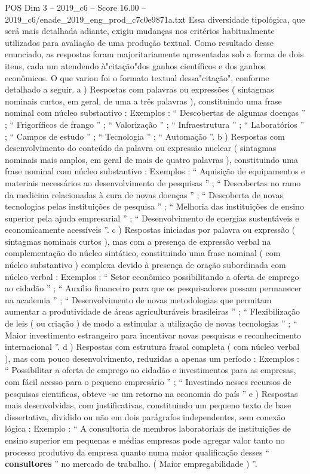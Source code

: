 \begin{textsample}{POS Dim 3 – 2019\_c6 – Score 16.00 – 2019\_c6/enade\_2019\_eng\_prod\_c7c0e9871a.txt}
Essa diversidade tipológica, que será mais detalhada adiante, exigiu mudanças nos critérios habitualmente utilizados para avaliação de uma produção textual.
Como resultado desse enunciado, as respostas foram majoritariamente apresentadas sob a forma de dois itens, cada um atendendo à"citação"dos ganhos científicos e dos ganhos econômicos.
O que variou foi o formato textual dessa"citação", conforme detalhado a seguir. a ) Respostas com palavras ou expressões ( sintagmas nominais curtos, em geral, de uma a três palavras ), constituindo uma frase nominal com núcleo substantivo : Exemplos : “ Descobertas de algumas doenças ” ; “ Frigoríficos de frango ” ; “ Valorização ” ; “ Infraestrutura ” ; “ Laboratórios ” ; “ Campos de estudo ” ; “ Tecnologia ” ; “ Automação ”. b ) Respostas com desenvolvimento do conteúdo da palavra ou expressão nuclear ( sintagmas nominais mais amplos, em geral de mais de quatro palavras ), constituindo uma frase nominal com núcleo substantivo : Exemplos : “ Aquisição de equipamentos e materiais necessários ao desenvolvimento de pesquisas ” ; “ Descobertas no ramo da medicina relacionadas à cura de novas doenças ” ; “ Descoberta de novas tecnologias pelas instituições de pesquisa ” ; “ Melhoria das instituições de ensino superior pela ajuda empresarial ” ; “ Desenvolvimento de energias sustentáveis e economicamente acessíveis ”. c ) Respostas iniciadas por palavra ou expressão ( sintagmas nominais curtos ), mas com a presença de expressão verbal na complementação do núcleo sintático, constituindo uma frase nominal ( com núcleo substantivo ) complexa devido à presença de oração subordinada com núcleo verbal : Exemplos : “ Setor econômico possibilitando a oferta de emprego ao cidadão ” ; “ Auxílio financeiro para que os pesquisadores possam permanecer na academia ” ; “ Desenvolvimento de novas metodologias que permitam aumentar a produtividade de áreas agriculturáveis brasileiras ” ; “ Flexibilização de leis ( ou criação ) de modo a estimular a utilização de novas tecnologias ” ; “ Maior investimento estrangeiro para incentivar novas pesquisas e reconhecimento internacional ”. d ) Respostas com estrutura frasal completa ( com núcleo verbal ), mas com pouco desenvolvimento, reduzidas a apenas um período : Exemplos : “ Possibilitar a oferta de emprego ao cidadão e investimentos para as empresas, com fácil acesso para o pequeno empresário ” ; “ Investindo nesses recursos de pesquisas cientificas, obteve -se um retorno na economia do país ” e ) Respostas mais desenvolvidas, com justificativas, constituindo um pequeno texto de base dissertativa, dividido ou não em dois parágrafos independentes, sem conexão lógica : Exemplo : “ A consultoria de membros laboratoriais de instituições de ensino superior em pequenas e médias empresas pode agregar valor tanto no processo produtivo da empresa quanto numa maior qualificação desses “ \textbf{consultores} ” no mercado de trabalho. ( Maior empregabilidade ) ”.

\end{textsample}
